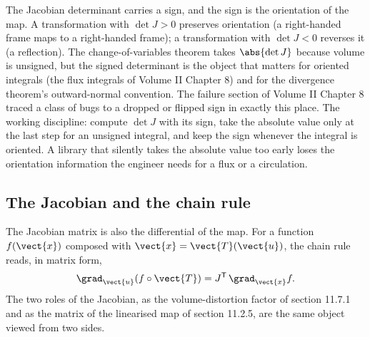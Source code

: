 \begin{mastery}
The Jacobian determinant carries a sign, and the sign is the
orientation of the map. A transformation with $\det J > 0$ preserves
orientation (a right-handed frame maps to a right-handed frame); a
transformation with $\det J < 0$ reverses it (a reflection). The
change-of-variables theorem takes $\abs{\det J}$ because volume is
unsigned, but the signed determinant is the object that matters for
oriented integrals (the flux integrals of Volume II Chapter 8) and
for the divergence theorem's outward-normal convention. The failure
section of Volume II Chapter 8 traced a class of bugs to a dropped
or flipped sign in exactly this place. The working discipline:
compute $\det J$ with its sign, take the absolute value only at the
last step for an unsigned integral, and keep the sign whenever the
integral is oriented. A library that silently takes the absolute
value too early loses the orientation information the engineer needs
for a flux or a circulation.
\end{mastery}

\subsection{The Jacobian and the chain rule}

The Jacobian matrix is also the differential of the map. For a
function $f(\vect{x})$ composed with $\vect{x} = \vect{T}(\vect{u})$,
the chain rule reads, in matrix form,
\[
\grad_{\vect{u}}(f \circ \vect{T}) = J^{\mathsf{T}}\,
\grad_{\vect{x}} f.
\]
The two roles of the Jacobian, as the volume-distortion factor of
section 11.7.1 and as the matrix of the linearised map of section
11.2.5, are the same object viewed from two sides.

